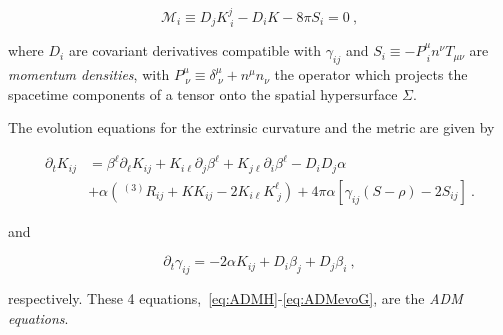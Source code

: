 \documentclass[a4paper,11pt]{article}
\renewcommand{\a}{\alpha}
\renewcommand{\b}{\beta}
\renewcommand{\d}{\delta}
\newcommand{\g}{\gamma}
\newcommand{\gDD}[2]{\g_{{#1}{#2}}}
\newcommand{\pd}{\partial}
\newcommand{\nn}{\nonumber}
\newcommand{\M}{\mathcal{M}}
\newcommand{\lrpar}[1]{\left( #1 \right)}
\newcommand{\lrsquare}[1]{\left[ #1 \right]}
\newcommand{\n}{\noindent}
\newcommand{\eq}[1]{
  \begin{equation}
    #1
  \end{equation}
}
\newcommand{\al}[1]{
  \begin{align}
    #1
  \end{align}
}
\begin{document}
\eq{ \M_{i} \equiv D_{j}K^{j}_{\ i} - D_{i}K - 8\pi S_{i} = 0\ ,\label{eq:ADMM} }

\noindent where $D_{i}$ are covariant derivatives compatible with $\gDD{i}{j}$ and $S_{i} \equiv - P^{\mu}_{\ i}n^{\nu}T_{\mu\nu}$ are \emph{momentum densities}, with $P^{\mu}_{\ \nu} \equiv \d^{\mu}_{\ \nu} + n^{\mu}n_{\nu}$ the operator which projects the spacetime components of a tensor onto the spatial hypersurface $\Sigma$.

The evolution equations for the extrinsic curvature and the metric are given by

\al{
  \pd_{t} K_{ij} &= \b^{\ell}\pd_{\ell}K_{ij} + K_{i\ell}\pd_{j}\b^{\ell} + K_{j\ell}\pd_{i}\b^{\ell} - D_{i}D_{j}\a\nn\\
                &+\a\lrpar{\,^{(3)}\!R_{ij} + K K_{ij} - 2K_{i\ell}K^{\ell}_{\ j}} + 4\pi\a\lrsquare{\g_{ij}\lrpar{S-\rho} -2S_{ij}}\ .\label{eq:ADMevoK}
}

\n and

\eq{ \pd_{t}\g_{ij} = -2\a K_{ij} + D_{i}\b_{j} + D_{j}\b_{i}\ ,\label{eq:ADMevoG} }

\n respectively. These 4 equations,~\eqref{eq:ADMH}-\eqref{eq:ADMevoG}, are the \emph{ADM equations}.
\end{document}
